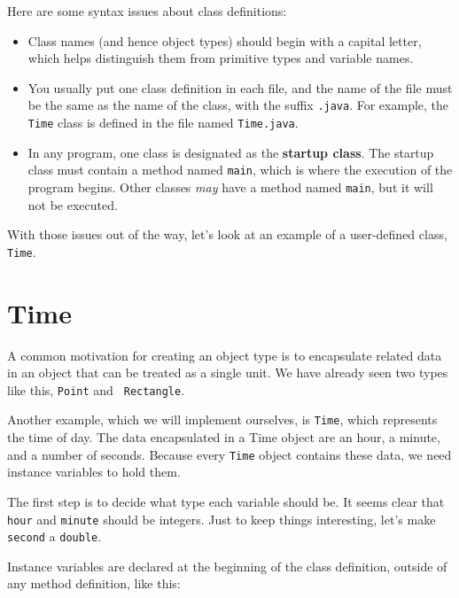Here are some syntax issues about class definitions:

\begin{itemize}

\item Class names (and hence object types) should begin with a capital
letter, which helps distinguish them from primitive types and variable
names.

\item You usually put one class definition in each file, and the name
of the file must be the same as the name of the class, with the suffix
{\tt .java}.  For example, the {\tt Time} class is defined in the file
named {\tt Time.java}.

\item In any program, one class is designated as the {\bf startup
class}.  The startup class must contain a method named {\tt main}, which
is where the execution of the program begins.  Other classes {\em may}
have a method named {\tt main}, but it will not be executed.

\end{itemize}

With those issues out of the way, let's look at an example of
a user-defined class, {\tt Time}.


\section{Time}

A common motivation for creating an object type is to encapsulate
related data in an object that can be treated as a single unit.  We
have already seen two types like this, {\tt Point} and {\tt
Rectangle}.

Another example, which we will implement ourselves, is {\tt Time},
which represents the time of day.  The data encapsulated in a Time
object are an hour, a minute, and a number of seconds.  Because every
{\tt Time} object contains these data, we need instance
variables to hold them.

The first step is to decide what type each variable should be.  It
seems clear that {\tt hour} and {\tt minute} should be integers.  Just
to keep things interesting, let's make {\tt second} a {\tt double}.


Instance variables are declared at the beginning of the class
definition, outside of any method definition, like this:

